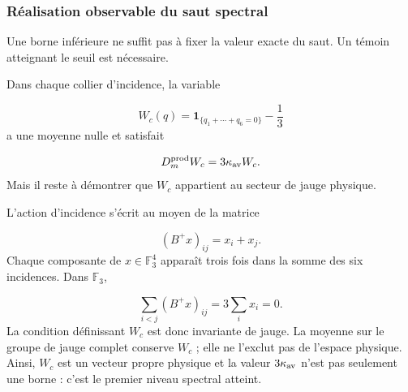 \subsubsection{Réalisation observable du saut spectral}
Une borne inférieure ne suffit pas à fixer la valeur exacte du saut. Un témoin atteignant le seuil est nécessaire.\par
Dans chaque collier d’incidence, la variable\par
\[
W_c(q)
=
\mathbf1_{\{q_1+\cdots+q_6=0\}}
-\frac13
\]
a une moyenne nulle et satisfait\par
\[
D_m^{\rm prod}W_c
=
3\kappa_{\rm av}W_c.
\]
Mais il reste à démontrer que \(W_c\) appartient au secteur de jauge physique.\par
L’action d’incidence s’écrit au moyen de la matrice\par
\[
(B^+x)_{ij}=x_i+x_j.
\]
Chaque composante de \(x\in\mathbb F_3^4\) apparaît trois fois dans la somme des six incidences. Dans \(\mathbb F_3\),\par
\[
\sum_{i<j}(B^+x)_{ij}
=
3\sum_i x_i
=
0.
\]
La condition définissant \(W_c\) est donc invariante de jauge. La moyenne sur le groupe de jauge complet conserve \(W_c\) ; elle ne l’exclut pas de l’espace physique. Ainsi, \(W_c\) est un vecteur propre physique et la valeur \(3\kappa_{\rm av}\) n’est pas seulement une borne : c’est le premier niveau spectral atteint.\par
{}

